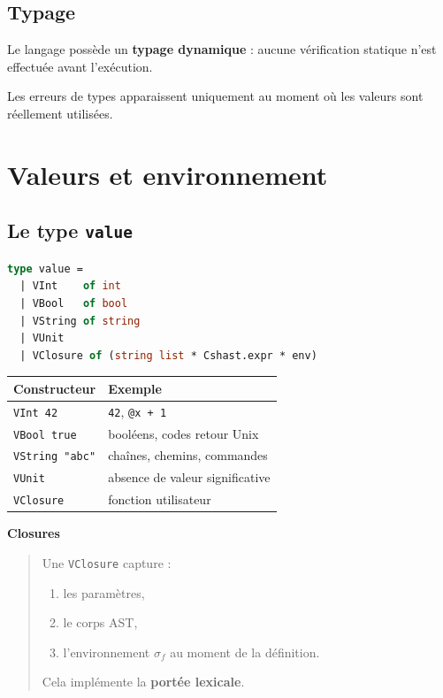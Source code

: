 \documentclass[11pt,a4paper]{article}
\newenvironment{bloc}[1]
{
  \par\medskip
  \noindent\textbf{#1}
  \par
  \smallskip
  \begin{quote}
}
{
  \end{quote}
  \medskip
}
\begin{document}
\subsection{Typage}

Le langage possède un \textbf{typage dynamique} :
aucune vérification statique n'est effectuée avant l'exécution.

Les erreurs de types apparaissent uniquement au moment
où les valeurs sont réellement utilisées.


\section{Valeurs et environnement}

\subsection{Le type \texttt{value}}

\begin{lstlisting}[language=ml]
type value =
  | VInt    of int
  | VBool   of bool
  | VString of string
  | VUnit
  | VClosure of (string list * Cshast.expr * env)
\end{lstlisting}

\begin{center}
\begin{tabular}{|p{4cm}|p{8cm}|}
\hline
\textbf{Constructeur} & \textbf{Exemple} \\
\hline
\texttt{VInt 42} & \texttt{42}, \texttt{@x + 1} \\
\hline
\texttt{VBool true} & booléens, codes retour Unix \\
\hline
\texttt{VString "abc"} & chaînes, chemins, commandes \\
\hline
\texttt{VUnit} & absence de valeur significative \\
\hline
\texttt{VClosure} & fonction utilisateur \\
\hline
\end{tabular}
\end{center}

\begin{bloc}{Closures}
Une \texttt{VClosure} capture :

\begin{enumerate}
  \item les paramètres,
  \item le corps AST,
  \item l'environnement $\sigma_f$ au moment de la définition.
\end{enumerate}

Cela implémente la \textbf{portée lexicale}.
\end{bloc}
\end{document}
